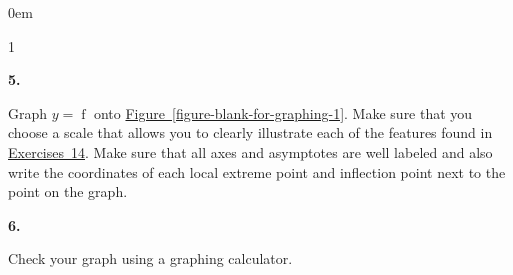 \documentclass[12pt,]{book}
\theoremstyle{plain}
\theoremstyle{definition}
\numberwithin{equation}{section}
\newcounter{figstack}
\newcounter{figindex}
\newlength\fight
\newcommand\pushValignCaptionBottom[5][b]{%
\stepcounter{figstack}%
\expandafter\def\csname %
figalign\romannumeral\value{figstack}\endcsname{#1}%
\expandafter\def\csname %
figtype\romannumeral\value{figstack}\endcsname{#2}%
\expandafter\def\csname %
figwd\romannumeral\value{figstack}\endcsname{#3}%
\expandafter\def\csname %
figcontent\romannumeral\value{figstack}\endcsname{#4}%
\expandafter\def\csname %
figcap\romannumeral\value{figstack}\endcsname{#5}%
\setbox0=\hbox{%
\begin{#2}{#3}#4\end{#2}}%
\ifdim\dimexpr\ht0+\dp0\relax>\fight\global\setlength{\fight}{%
\dimexpr\ht0+\dp0\relax}\fi%
}
\newcommand\popValignCaptionBottom{%
\setcounter{figindex}{0}%
\hfill%
\whiledo{\value{figindex}<\value{figstack}}{%
\stepcounter{figindex}%
\def\tmp{\csname figwd\romannumeral\value{figindex}\endcsname}%
\begin{\csname figtype\romannumeral\value{figindex}\endcsname}[t]{\tmp}%
\centering%
\stackinset{c}{}%
{\csname figalign\romannumeral\value{figindex}\endcsname}{}%
{\csname figcontent\romannumeral\value{figindex}\endcsname}%
{\rule{0pt}{\fight}}\par%
\csname figcap\romannumeral\value{figindex}\endcsname%
\end{\csname figtype\romannumeral\value{figindex}\endcsname}%
\hfill%
}%
\setcounter{figstack}{0}%
\setlength{\fight}{0pt}%
\hfill%
}
\newenvironment{exercisegroup}%
{\medskip\noindent}%
{\par\bigskip}%
\newlength{\exercisegroupindent}%
\newlength{\exercisegroupitemwidth}%
\newenvironment{exercisegrouplist}%
{\vspace{-\partopsep}%
\begin{adjustwidth}{\exercisegroupindent}{0em}}%
{\end{adjustwidth}%
\vspace{-\partopsep}%
\vspace{\baselineskip}}%
\newenvironment{exercisegroupbycol}[1]%
{\begin{exercisegrouplist}%
\vspace{-\multicolsep}%
\begin{multicols}{#1}%
\setlength{\parindent}{0em}%
\setlength{\exercisegroupitemwidth}{\linewidth}}%
{\end{multicols}%
\vspace{-\multicolsep}%
\end{exercisegrouplist}}%
\newenvironment{exercisegroupitem}[1]%
{\begin{minipage}[t]{\exercisegroupitemwidth}
\vspace{0pt}%
{\bfseries#1}%
\rule{0pt}{\baselineskip}}{\strut%
\end{minipage}%
\hspace{\columnsep}}%
\providecommand\phantomsection{}
\newcommand{\fe}[2]{\mathop{{#1}{\left(#2\right)}}}
\begin{document}
\begin{exercisegroup}
\begin{exercisegroupbycol}{1}
\begin{exercisegroupitem}{5. }
Graph \(y=\fe{f}{x}\) onto \hyperref[figure-blank-for-graphing-1]{Figure~\ref*{figure-blank-for-graphing-1}}. Make sure that you choose a scale that allows you to clearly illustrate each of the features found in \hyperref[exercise-sketch-first-asymptotes]{Exercises~1}\textendash{}\hyperref[exercise-sketch-first-critical-numbers]{4}.  Make sure that all axes and asymptotes are well labeled and also write the coordinates of each local extreme point and inflection point next to the point on the graph.%
\end{exercisegroupitem}%
\par%
\begin{exercisegroupitem}{6. }\phantomsection\hypertarget{exercise-454}{\null}
Check your graph using a graphing calculator.%
\end{exercisegroupitem}%
\par%
\end{exercisegroupbycol}%
\end{exercisegroup}%
\end{document}

